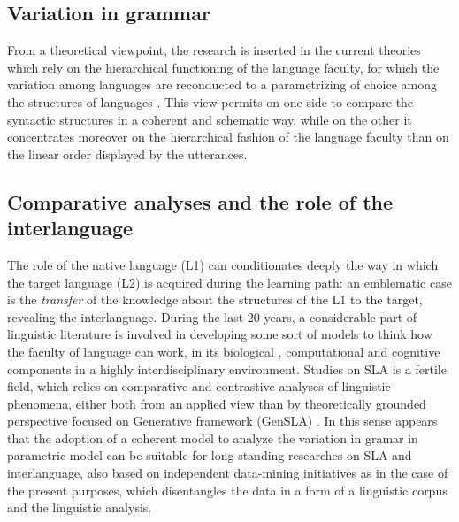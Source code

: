 \documentclass[a4paper,twoside,11pt,chapterprefix=false,bibliography=totocnumbered]{scrbook}
\theoremstyle{definition}
\theoremstyle{definition}
\theoremstyle{definition}
\theoremstyle{remark}
\begin{document}
\subsection{Variation in grammar}\label{variation-in-grammar}

From a theoretical viewpoint, the research is inserted in the current
theories which rely on the hierarchical functioning of the language
faculty, for which the variation among languages are reconducted to a
parametrizing of choice among the structures of languages
\citep[\citet{chomsky1998}, \citet{chomsky2013}, \citet{chomsky2015},
\citet{adger2011}, \citet{rizzi2013}]{chomsky1995}. This view permits on
one side to compare the syntactic structures in a coherent and schematic
way, while on the other it concentrates moreover on the hierarchical
fashion of the language faculty than on the linear order displayed by
the utterances.

\subsection{Comparative analyses and the role of the
interlanguage}\label{comparative-analyses-and-the-role-of-the-interlanguage}

The role of the native language (L1) can conditionates deeply the way in
which the target language (L2) is acquired during the learning path: an
emblematic case is the \emph{transfer} of the knowledge about the
structures of the L1 to the target, revealing the interlanguage. During
the last 20 years, a considerable part of linguistic literature is
involved in developing some sort of models to think how the faculty of
language can work, in its biological \citep{hcf2002}, computational
\citep{fodor2001} and cognitive components in a highly interdisciplinary
environment. Studies on SLA is a fertile field, which relies on
comparative and contrastive analyses of linguistic phenomena, either
both from an applied view \citep{ellis_study_101} than by theoretically
grounded perspective focused on Generative framework (GenSLA)
\citep[\citet{rothman_slabakova_2017}, \citet{hawkins2001},
\citet{sorace2011pinning}]{guasti2002}. In this sense appears that the
adoption of a coherent model to analyze the variation in gramar in
parametric model can be suitable for long-standing researches on SLA and
interlanguage, also based on independent data-mining initiatives as in
the case of the present purposes, which disentangles the data in a form
of a linguistic corpus and the linguistic analysis.
\end{document}
